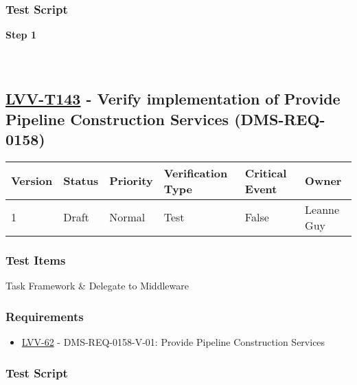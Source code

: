 \hypertarget{test-script-119}{%
\subsubsection{Test Script}\label{test-script-119}}

\textbf{Step 1}\\
~\\
~\\

\hypertarget{lvv-t143---verify-implementation-of-provide-pipeline-construction-services-dms-req-0158}{%
\subsection{\texorpdfstring{\href{https://jira.lsstcorp.org/secure/Tests.jspa\#/testCase/LVV-T143}{LVV-T143}
- Verify implementation of Provide Pipeline Construction Services
(DMS-REQ-0158)}{LVV-T143 - Verify implementation of Provide Pipeline Construction Services (DMS-REQ-0158)}}\label{lvv-t143---verify-implementation-of-provide-pipeline-construction-services-dms-req-0158}}

\begin{longtable}[]{@{}llllll@{}}
\toprule
Version & Status & Priority & Verification Type & Critical Event &
Owner\tabularnewline
\midrule
\endhead
1 & Draft & Normal & Test & False & Leanne Guy\tabularnewline
\bottomrule
\end{longtable}

\hypertarget{test-items-119}{%
\subsubsection{Test Items}\label{test-items-119}}

Task Framework \& Delegate to Middleware

\hypertarget{requirements-120}{%
\subsubsection{Requirements}\label{requirements-120}}

\begin{itemize}
\tightlist
\item
  \href{https://jira.lsstcorp.org/browse/LVV-62}{LVV-62} -
  DMS-REQ-0158-V-01: Provide Pipeline Construction Services
\end{itemize}

\hypertarget{test-script-120}{%
\subsubsection{Test Script}\label{test-script-120}}


